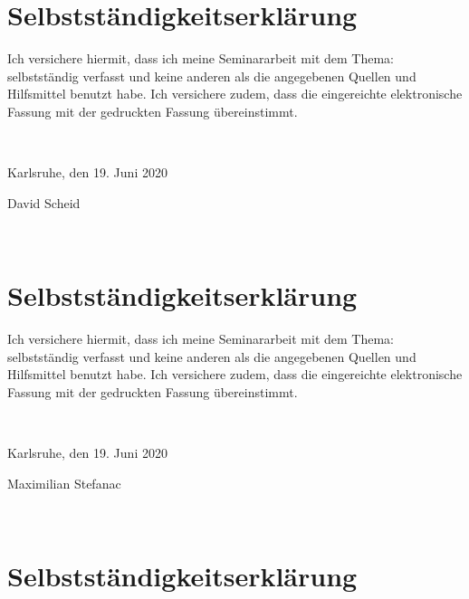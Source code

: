 
\section*{Selbstständigkeitserklärung}

Ich versichere hiermit, dass ich meine Seminararbeit mit dem Thema: \textquote{\mytitle} selbstständig verfasst und keine anderen als die angegebenen Quellen und Hilfsmittel benutzt habe. Ich versichere zudem, dass die eingereichte elektronische Fassung mit der gedruckten Fassung übereinstimmt.

\mbox{}\vspace{4\baselineskip}\\

\parbox{7cm}{\centering Karlsruhe, den 19. Juni 2020
}
\hfill
\parbox{4cm}{
	\strut \centering David Scheid}

\mbox{}\vspace{4\baselineskip}\\
\clearpage

\section*{Selbstständigkeitserklärung}

Ich versichere hiermit, dass ich meine Seminararbeit mit dem Thema: \textquote{\mytitle} selbstständig verfasst und keine anderen als die angegebenen Quellen und Hilfsmittel benutzt habe. Ich versichere zudem, dass die eingereichte elektronische Fassung mit der gedruckten Fassung übereinstimmt.

\mbox{}\vspace{4\baselineskip}\\


\parbox{7cm}{\centering Karlsruhe, den 19. Juni 2020
}
\hfill
\parbox{4cm}{
	\strut \centering Maximilian Stefanac}

\mbox{}\vspace{4\baselineskip}\\
\clearpage


\section*{Selbstständigkeitserklärung}

